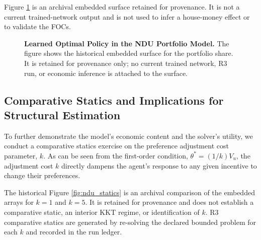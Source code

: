 \documentclass[ecta]{econsocart}
\theoremstyle{plain}
\theoremstyle{remark}
\begin{document}
Figure \ref{fig:ndu_policy} is an archival embedded surface retained for provenance. It is not a current trained-network output and is not used to infer a house-money effect or to validate the FOCs.

\begin{figure}[H]
\centering
{}
\caption{\textbf{Learned Optimal Policy in the NDU Portfolio Model.} The figure shows the historical embedded surface for the portfolio share. It is retained for provenance only; no current trained network, R3 run, or economic inference is attached to the surface.}
\label{fig:ndu_policy}
\end{figure}


\subsection{Comparative Statics and Implications for Structural Estimation}
To further demonstrate the model's economic content and the solver's utility, we conduct a comparative statics exercise on the preference adjustment cost parameter, $k$. As can be seen from the first-order condition, $\theta^* = (1/k)V_u$, the adjustment cost $k$ directly dampens the agent's response to any given incentive to change their preferences.

The historical Figure \ref{fig:ndu_statics} is an archival comparison of the embedded arrays for $k=1$ and $k=5$. It is retained for provenance and does not establish a comparative static, an interior KKT regime, or identification of $k$. R3 comparative statics are generated by re-solving the declared bounded problem for each $k$ and recorded in the run ledger.
\end{document}
